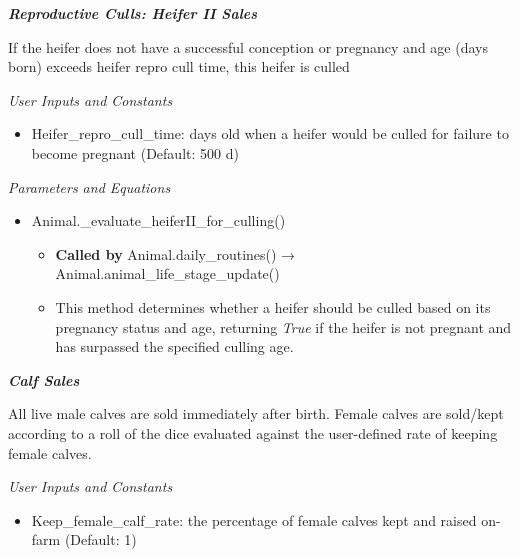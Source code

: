\documentclass{article}
\begin{document}
\begin{refsection}
    \textbf{\textit{Reproductive Culls: Heifer II Sales}}
    \vspace{0.2cm}

    If the heifer does not have a successful conception or pregnancy and age (days born) exceeds heifer repro cull time, this heifer is culled
        \vspace{0.2cm}
        
         \textit{User Inputs and Constants}
         \vspace{0.1cm}
         
         \begin{itemize}
             \item Heifer\_repro\_cull\_time: days old when a heifer would be culled for failure to become pregnant (Default: 500 d)

         \end{itemize}

         \textit{Parameters and Equations}
         \vspace{0.1cm}

         \begin{itemize}
             \item Animal.\_evaluate\_heiferII\_for\_culling()
            \begin{itemize}
                \item \textbf{Called by} Animal.daily\_routines() → Animal.animal\_life\_stage\_update()
                \item This method determines whether a heifer should be culled based on its pregnancy status and age, returning \textit{True} if the heifer is not pregnant and has surpassed the specified culling age.
            \end{itemize}
         \end{itemize}
        

    \textbf{\textit{Calf Sales}}
    \vspace{0.2cm}     

    All live male calves are sold immediately after birth. Female calves are sold/kept according to a roll of the dice evaluated against the user-defined rate of keeping female calves.
        \vspace{0.2cm}
        
         \textit{User Inputs and Constants}
         \vspace{0.1cm}

         \begin{itemize}
             \item Keep\_female\_calf\_rate: the percentage of female calves kept and raised on-farm (Default: 1)


\end{itemize}
\end{refsection}
\end{document}
